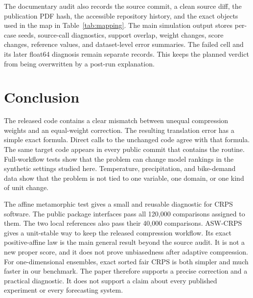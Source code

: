 \documentclass[11pt]{article}
\begin{document}
The documentary audit also records the source commit, a clean source diff, the publication PDF hash, the accessible repository history, and the exact objects used in the map in Table~\ref{tab:mapping}. The main simulation output stores per-case seeds, source-call diagnostics, support overlap, weight changes, score changes, reference values, and dataset-level error summaries. The failed cell and its later float64 diagnosis remain separate records. This keeps the planned verdict from being overwritten by a post-run explanation.

\section{Conclusion}

The released code contains a clear mismatch between unequal compression weights and an equal-weight correction. The resulting translation error has a simple exact formula. Direct calls to the unchanged code agree with that formula. The same target code appears in every public commit that contains the routine. Full-workflow tests show that the problem can change model rankings in the synthetic settings studied here. Temperature, precipitation, and bike-demand data show that the problem is not tied to one variable, one domain, or one kind of unit change.

The affine metamorphic test gives a small and reusable diagnostic for CRPS software. The public package interfaces pass all 120,000 comparisons assigned to them. The two local references also pass their 40,000 comparisons. ASW-CRPS gives a unit-stable way to keep the released compression workflow. Its exact positive-affine law is the main general result beyond the source audit. It is not a new proper score, and it does not prove unbiasedness after adaptive compression. For one-dimensional ensembles, exact sorted fair CRPS is both simpler and much faster in our benchmark. The paper therefore supports a precise correction and a practical diagnostic. It does not support a claim about every published experiment or every forecasting system.
\end{document}
